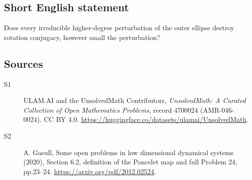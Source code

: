 \documentclass[11pt]{article}
\begin{document}
\subsection{Short English statement}
Does every irreducible higher-degree perturbation of the outer ellipse destroy rotation conjugacy, however small the perturbation?
\subsection{Sources}
\begin{description}
\item[\hypertarget{source:4700024:1}{S1}] ULAM.AI and the UnsolvedMath Contributors, \emph{UnsolvedMath: A Curated Collection of Open Mathematics Problems}, record 4700024 (AMR-046-0024). CC BY 4.0. \url{https://huggingface.co/datasets/ulamai/UnsolvedMath}.
\item[\hypertarget{source:4700024:2}{S2}] A. Gasull, Some open problems in low dimensional dynamical systems (2020), Section 6.2, definition of the Poncelet map and full Problem 24, pp.23--24. \url{https://arxiv.org/pdf/2012.02524}.
\end{description}
\label{end:4700024}
\end{document}
